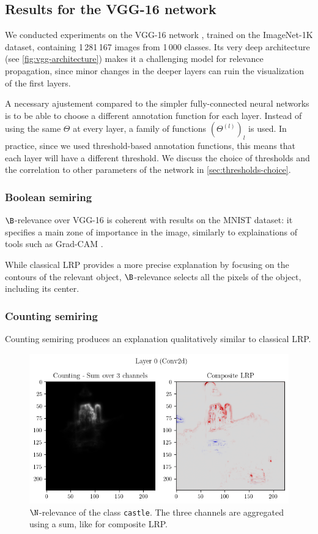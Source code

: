 \documentclass[twocolumn]{../cs-classes/cs-classes}
\newcommand*{\1}{\digitsbb{1}}
\newcommand*{\0}{\digitsbb{0}}
\begin{document}
\subsection{Results for the VGG-16 network}
We conducted experiments on the VGG-16 network \cite{vgg}, trained on the ImageNet-1K dataset, containing 1\,281\,167 images from 1\,000 classes. Its very deep architecture (see \autoref{fig:vgg-architecture}) makes it a challenging model for relevance propagation, since minor changes in the deeper layers can ruin the visualization of the first layers.

A necessary ajustement compared to the simpler fully-connected neural networks is to be able to choose a different annotation function for each layer. Instead of using the same $\Theta$ at every layer, a family of functions $(\Theta^{(l)})_l$ is used. In practice, since we used threshold-based annotation functions, this means that each layer will have a different threshold. We discuss the choice of thresholds and the correlation to other parameters of the network in \autoref{sec:thresholds-choice}.

\subsubsection{Boolean semiring}
$\B$-relevance over VGG-16 is coherent with results on the MNIST dataset: it specifies a main zone of importance in the image, similarly to explainations of tools such as Grad-CAM \cite{gradcam}.

While classical LRP provides a more precise explanation by focusing on the contours of the relevant object, $\B$-relevance selects all the pixels of the object, including its center.

\subsubsection{Counting semiring}
Counting semiring produces an explanation qualitatively similar to classical LRP. 
\begin{figure}[H]
    \centering
    \includegraphics[width=\linewidth]{vgg-counting.png}
    \caption{$\N$-relevance of the class \texttt{castle}. The three channels are aggregated using a sum, like for composite LRP.}
\end{figure}
\end{document}
